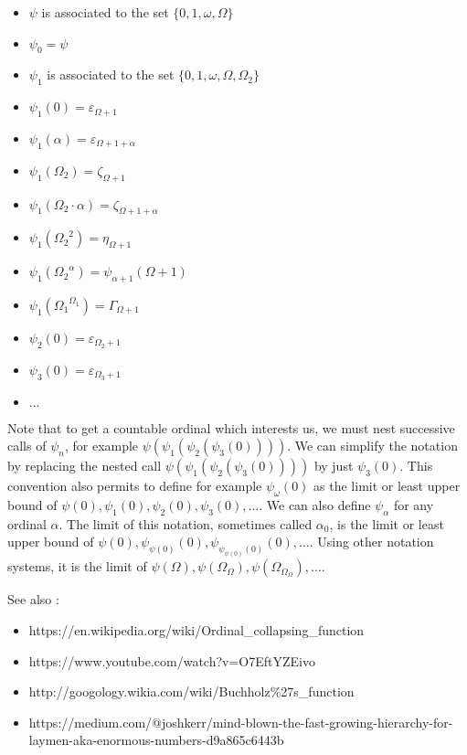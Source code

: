 \documentclass[10pt]{article}
\begin{document}
\begin{itemize}
     \setlength{\itemsep}{1pt}
     \setlength{\parskip}{0pt}
     \setlength{\parsep}{0pt}
\item \( \psi \) is associated to the set \( \lbrace 0, 1, \omega, \Omega \rbrace \)
\item \( \psi_0 = \psi \)
\item \( \psi_1 \) is associated to the set \( \lbrace 0, 1, \omega, \Omega, \Omega_2 \rbrace \)
\item \( \psi_1(0) = \varepsilon_{\Omega+1} \)
\item \( \psi_1(\alpha) = \varepsilon_{\Omega+1+\alpha} \)
\item \( \psi_1(\Omega_2) = \zeta_{\Omega+1} \)
\item \( \psi_1(\Omega_2 \cdot \alpha) = \zeta_{\Omega+1+\alpha} \)
\item \( \psi_1({\Omega_2}^2) = \eta_{\Omega+1} \)
\item \( \psi_1({\Omega_2}^\alpha) = \psi_{\alpha+1}(\Omega+1) \)
\item \( \psi_1({\Omega_1}^{\Omega_1}) = \Gamma_{\Omega+1} \)
\item \( \psi_2(0) = \varepsilon_{\Omega_2+1} \)
\item \( \psi_3(0) = \varepsilon_{\Omega_3+1} \)
\item \( \ldots \)
\end{itemize}

Note that to get a countable ordinal which interests us, we must nest successive calls of \( \psi_n \), for example \( \psi(\psi_1(\psi_2(\psi_3(0)))) \). We can simplify the notation by replacing the nested call \( \psi(\psi_1(\psi_2(\psi_3(0)))) \) by just \( \psi_3(0) \). This convention also permits to define for example \( \psi_\omega(0) \) as the limit or least upper bound of \( \psi(0), \psi_1(0), \psi_2(0), \psi_3(0), \ldots \). We can also define \( \psi_\alpha \) for any ordinal \( \alpha \). The limit of this notation, sometimes called \( \alpha_0 \), is the limit or least upper bound of \( \psi(0), \psi_{\psi(0)}(0), \psi_{\psi_{\psi(0)}(0)}(0), \ldots \). Using other notation systems, it is the limit of \( \psi(\Omega), \psi(\Omega_\Omega), \psi(\Omega_{\Omega_\Omega}), \ldots \).

See also :

\begin{itemize}
     \setlength{\itemsep}{1pt}
     \setlength{\parskip}{0pt}
     \setlength{\parsep}{0pt}
\item https://en.wikipedia.org/wiki/Ordinal\_collapsing\_function
\item https://www.youtube.com/watch?v=O7EftYZEivo
\item http://googology.wikia.com/wiki/Buchholz\%27s\_function
\item https://medium.com/@joshkerr/mind-blown-the-fast-growing-hierarchy-for-laymen-aka-enormous-numbers-d9a865c6443b
\end{itemize}
\end{document}
